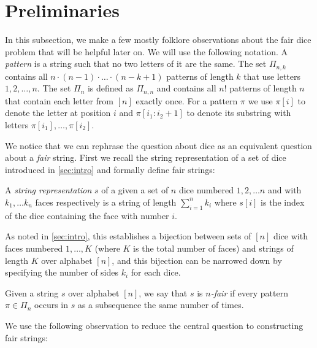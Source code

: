 \documentclass{article}
\begin{document}
\section{Preliminaries}
\label{sec:preliminaries}

In this subsection, we make a few mostly folklore observations about the fair dice problem that will be helpful later on. 
We will use the following notation. A \emph{pattern} is a string such that no two letters of it are the same. The set $\Pi_{n,k}$ contains all $n\cdot (n-1) \cdot \dots \cdot (n-k+1)$ patterns of length $k$ that use letters $1, 2, \dots, n$. The set $\Pi_n$ is defined as $\Pi_{n,n}$ and contains all $n!$ patterns of length $n$ that contain each letter from $[n]$ exactly once. For a pattern $\pi$ we use $\pi[i]$ to denote the letter at position $i$ and  $\pi[i_1:i_2+1]$ to denote its substring with letters $\pi[i_1], \dots, \pi[i_2]$. 


We notice that we can rephrase the question about dice as an equivalent question about a \emph{fair} string. 
First we recall the string representation of a set of dice introduced in \cref{sec:intro} and formally define fair strings:

\begin{definition}
    A \textit{string representation} $s$ of a given a set of $n$ dice numbered $1, 2, \dots n$ and with $k_1, \dots k_n$ faces respectively is a string of length $\sum_{i = 1}^n k_i$ where $s[i]$ is the index of the dice containing the face with number $i$.
\end{definition}

As noted in \cref{sec:intro}, this establishes a bijection between sets of $[n]$ dice with faces numbered $1, \dots, K$ (where $K$ is the total number of faces) and strings of length $K$ over alphabet $[n]$, and this bijection can be narrowed down by specifying the number of sides $k_i$ for each dice.

\begin{definition}
\label{def:fair_string}
    Given a string $s$ over alphabet $[n]$, we say that $s$ is \emph{$n$-fair} if every pattern $\pi \in \Pi_n$ occurs in $s$ as a subsequence the same number of times. 
\end{definition}

We use the following observation to reduce the central question to constructing fair strings:
\end{document}
